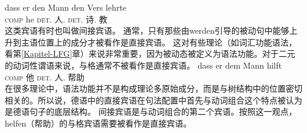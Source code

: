 \ex 
\gll dass er den Mann den Vers lehrte\\
	 \textsc{comp} he \textsc{det}.\acc{} 人.\acc{} \textsc{det}.\acc{} 诗.\acc{} 教\\
\zl
这类宾语有时也叫做间接宾语。
通常，只有那些由werden引导的被动句中能够上升到主语位置上的成分才被看作是直接宾语。
这对有些理论（如词汇功能语法，看第\ref{Kapitel-LFG}章）来说非常重要，因为被动态被定义为语法功能。对于二元的动词性谓语来说，与格通常不被看作是直接宾语\citep{Cook2006a-u}。
\ea
\gll dass er dem Mann hilft\\
     \textsc{comp} 他 \textsc{det}.\dat{} 人.\dat{} 帮助\\
\z
在很多理论中，语法功能并不是构成理论多原始成分，而是与树结构中的位置密切相关的。所以说，德语中的直接宾语在句法配置中首先与动词组合这个特点被认为是德语句子的底层结构。
间接宾语是与动词组合的第二个宾语。按照这一观点，helfen（帮助）的与格宾语需要被看作是直接宾语。

